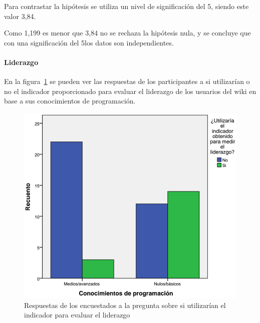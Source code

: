 Para contrastar la hipótesis se utiliza un nivel de significación del 5\percentage, siendo este valor 3,84. 

\begin{center}
\end{center}

Como 1,199 es menor que 3,84 no se rechaza la hipótesis nula, y se concluye que con una significación del 5\percentage{ }los datos son independientes.

\begin{center}
\end{center}

\paragraph*{Liderazgo}

En la figura~\ref{fig:app:barras:programacion:liderazgo} se pueden ver las respuestas de los participantes a si utilizarían o no el indicador proporcionado para evaluar el liderazgo de los usuarios del wiki en base a sus conocimientos de programación.

\begin{figure}
  \begin{center}
    \includegraphics[scale=0.3]{barras_programacion_liderazgo.png}
  \end{center}
  \caption{Respuestas de los encuestados a la pregunta sobre si utilizarían el indicador para evaluar el liderazgo}
  \label{fig:app:barras:programacion:liderazgo}
\end{figure}

